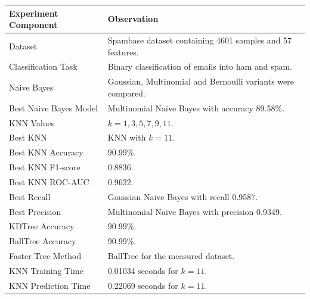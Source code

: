 \documentclass[12pt,a4paper]{article}
\begin{document}
\begin{longtable}{|p{5cm}|p{8cm}|}
\hline
\textbf{Experiment Component} & \textbf{Observation} \\ \hline

Dataset &
Spambase dataset containing 4601 samples and 57 features. \\ \hline

Classification Task &
Binary classification of emails into ham and spam. \\ \hline

Naive Bayes &
Gaussian, Multinomial and Bernoulli variants were compared. \\ \hline

Best Naive Bayes Model &
Multinomial Naive Bayes with accuracy 89.58\%. \\ \hline

KNN Values &
$k=1,3,5,7,9,11$. \\ \hline

Best KNN &
KNN with $k=11$. \\ \hline

Best KNN Accuracy &
90.99\%. \\ \hline

Best KNN F1-score &
0.8836. \\ \hline

Best KNN ROC-AUC &
0.9622. \\ \hline

Best Recall &
Gaussian Naive Bayes with recall 0.9587. \\ \hline

Best Precision &
Multinomial Naive Bayes with precision 0.9349. \\ \hline

KDTree Accuracy &
90.99\%. \\ \hline

BallTree Accuracy &
90.99\%. \\ \hline

Faster Tree Method &
BallTree for the measured dataset. \\ \hline

KNN Training Time &
0.01034 seconds for $k=11$. \\ \hline

KNN Prediction Time &
0.22069 seconds for $k=11$. \\ \hline

\end{longtable}

\end{document}

